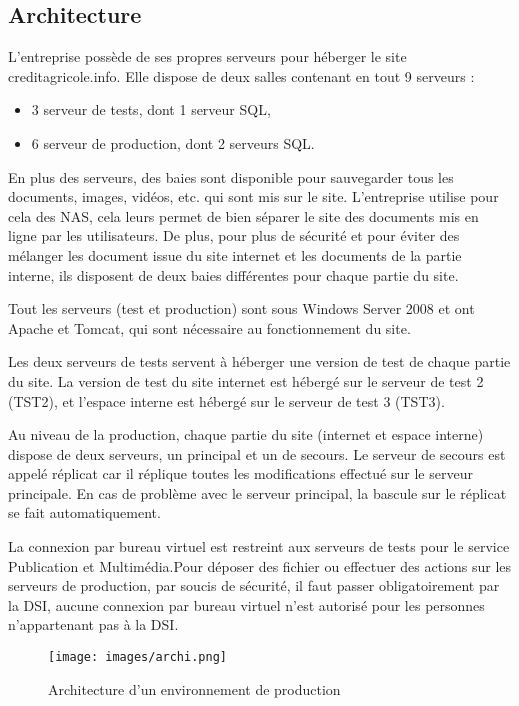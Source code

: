 \documentclass[12pt,a4paper]{article}
\begin{document}
\subsection{Architecture}
L'entreprise possède de ses propres serveurs pour héberger le site creditagricole.info. Elle dispose de deux salles contenant en tout 9 serveurs :
\begin{itemize}
\item 3 serveur de tests, dont 1 serveur SQL,
\item 6 serveur de production, dont 2 serveurs SQL.
\end{itemize}
En plus des serveurs, des baies sont disponible pour sauvegarder tous les documents, images, vidéos, etc. qui sont mis sur le site. L'entreprise utilise pour cela des NAS, cela leurs permet de bien séparer le site des documents mis en ligne par les utilisateurs. De plus, pour plus de sécurité et pour éviter des mélanger les document issue du site internet et les documents de la partie interne, ils disposent de deux baies différentes pour chaque partie du site.\par
\medskip
Tout les serveurs (test et production) sont sous Windows Server 2008 et ont Apache et Tomcat, qui sont nécessaire au fonctionnement du site.\par
Les deux serveurs de tests servent à héberger une version de test de chaque partie du site. La version de test du site internet est hébergé sur le serveur de test 2 (TST2), et l'espace interne est hébergé sur le serveur de test 3 (TST3).\par
Au niveau de la production, chaque partie du site (internet et espace interne) dispose de deux serveurs, un principal et un de secours. Le serveur de secours est appelé réplicat car il réplique toutes les modifications effectué sur le serveur principale. En cas de problème avec le serveur principal, la bascule sur le réplicat se fait automatiquement.\par
La connexion par bureau virtuel est restreint aux serveurs de tests pour le service Publication et Multimédia.Pour déposer des fichier ou effectuer des actions sur les serveurs de production, par soucis de sécurité, il faut passer obligatoirement par la DSI, aucune connexion par bureau virtuel n'est autorisé pour les personnes n'appartenant pas à la DSI.\par
\begin{figure}[h!]
\centering
\texttt{[image: images/archi.png]} 
\caption{Architecture d'un environnement de production}
\end{figure}
\newpage
\end{document}

